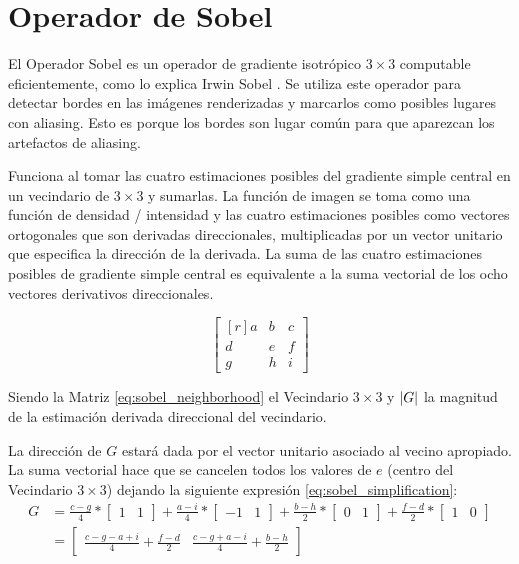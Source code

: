 \documentclass[pregrado]{tesis-usb} %
\DeclarePairedDelimiter\abs{\lvert}{\rvert}%
\begin{document}
\section{Operador de Sobel}
El Operador Sobel es un operador de gradiente isotrópico $3\times 3$ computable eficientemente, como lo explica Irwin Sobel \cite{Sobel2014}. Se utiliza este operador para detectar bordes en las imágenes renderizadas y marcarlos como posibles lugares con aliasing. Esto es porque los bordes son lugar común para que aparezcan los artefactos de aliasing. 

Funciona al tomar las cuatro estimaciones posibles del gradiente simple central en un vecindario de $3\times 3$ y sumarlas. La función de imagen se toma como una función de densidad / intensidad y las cuatro estimaciones posibles como vectores ortogonales que son derivadas direccionales, multiplicadas por un vector unitario que especifica la dirección de la derivada. La suma de las cuatro estimaciones posibles de gradiente simple central es equivalente a la suma vectorial de los ocho vectores derivativos direccionales.

\begin{equation}
\begin{bmatrix*}[r]\label{eq:sobel_neighborhood}
a & b & c \\
d & e & f \\
g & h & i
\end{bmatrix*}
\end{equation}

Siendo la Matriz \ref{eq:sobel_neighborhood} el Vecindario $3\times 3$ y $\abs*{G}$ la magnitud de la estimación derivada direccional del vecindario.

La dirección de $G$ estará dada por el vector unitario asociado al vecino apropiado. La suma vectorial hace que se cancelen todos los valores de $e$ (centro del Vecindario $3\times 3$) dejando la siguiente expresión \ref{eq:sobel_simplification}:
\begin{equation}\label{eq:sobel_simplification}
\begin{split}
	G & =\frac{c-g}{4}*\begin{bmatrix*}1 & 1\end{bmatrix*}+\frac{a-i}{4}*\begin{bmatrix*}-1 & 1\end{bmatrix*}+\frac{b-h}{2}*\begin{bmatrix*}0 & 1\end{bmatrix*}+\frac{f-d}{2}*\begin{bmatrix*}1 & 0\end{bmatrix*} \\ & =\begin{bmatrix*}\frac{c-g-a+i}{4}+\frac{f-d}{2} & \frac{c-g+a-i}{4}+\frac{b-h}{2}\end{bmatrix*}
\end{split}
\end{equation}
\end{document}
